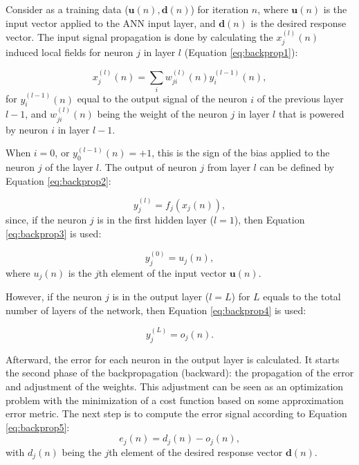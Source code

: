 Consider as a training data ($\mathbf{u}(n), \mathbf{d}(n)$) for iteration $n$, where $\mathbf{u}(n)$ is the input vector applied to the ANN input layer, and $\mathbf{d}(n)$ is the desired response vector. The input signal propagation is done by calculating the $x_j^{(l)}(n)$ induced local fields for neuron $j$ in layer $l$ (Equation \ref{eq:backprop1}):

\begin{equation}
\label{eq:backprop1}
    x_j^{(l)}(n) = \sum_i w_{ji}^{(l)}(n) y_i^{(l-1)}(n),
\end{equation}
for $y_i^{(l-1)}(n)$ equal to the output signal of the neuron $i$ of the previous layer $l-1$, and $w_{ji}^{(l)}(n)$ being the weight of the neuron $j$ in layer $l$ that is powered by neuron $i$ in layer $l-1$.

When $i=0$, or $y_0^{(l-1)}(n) = +1$, this is the sign of the bias applied to the neuron $j$ of the layer $l$. The output of neuron $j$ from layer $l$ can be defined by Equation \ref{eq:backprop2}:

\begin{equation}
\label{eq:backprop2}
    y_j^{(l)} = f_j (x_j (n) ),
\end{equation}
since, if the neuron $j$ is in the first hidden layer ($l = 1$), then Equation \ref{eq:backprop3} is used:

\begin{equation}
    \label{eq:backprop3}
    y_j^{(0)} = u_j (n),
\end{equation}
where $u_j(n)$ is the $j$th element of the input vector $\mathbf{u}(n)$. 

However, if the neuron $j$ is in the output layer ($l = L$) for $L$ equals to the total number of layers of the network, then Equation \ref{eq:backprop4} is used:

\begin{equation}
    \label{eq:backprop4}
    y_j^{(L)} = o_j (n).
\end{equation}

Afterward, the error for each neuron in the output layer is calculated. It starts the second phase of the backpropagation (backward): the propagation of the error and adjustment of the weights. This adjustment can be seen as an optimization problem with the minimization of a cost function based on some approximation error metric. The next step is to compute the error signal according to Equation \ref{eq:backprop5}:
\begin{equation}
    \label{eq:backprop5}
    e_j (n) = d_j(n) - o_j (n),
\end{equation}
with $d_j (n)$ being the $j$th element of the desired response vector $\mathbf{d}(n)$.

